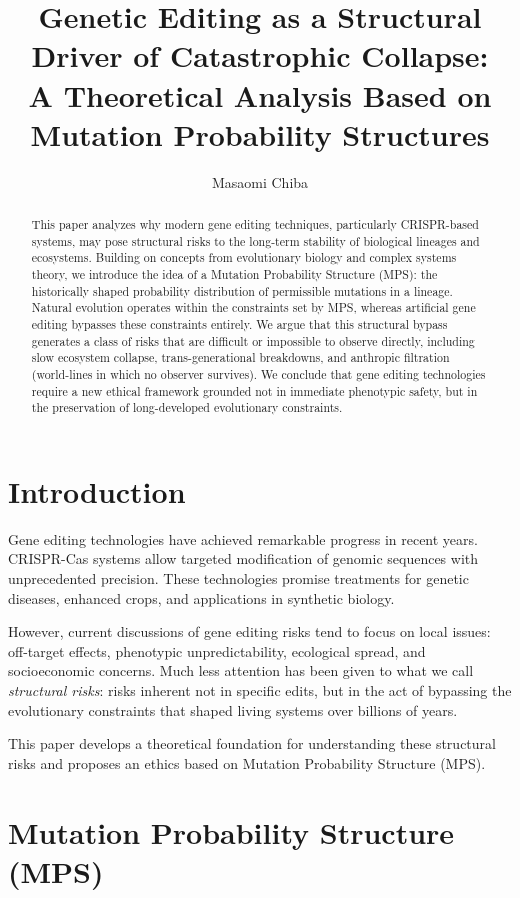 \documentclass[11pt]{article}
\title{Genetic Editing as a Structural Driver of Catastrophic Collapse:\\
A Theoretical Analysis Based on Mutation Probability Structures}
\author[1]{Masaomi Chiba}
\affil[1]{Independent Researcher}
\date{}
\begin{document}
\maketitle

\begin{abstract}
This paper analyzes why modern gene editing techniques, particularly CRISPR-based systems, may pose structural risks to the long-term stability of biological lineages and ecosystems. Building on concepts from evolutionary biology and complex systems theory, we introduce the idea of a Mutation Probability Structure (MPS): the historically shaped probability distribution of permissible mutations in a lineage. Natural evolution operates within the constraints set by MPS, whereas artificial gene editing bypasses these constraints entirely. We argue that this structural bypass generates a class of risks that are difficult or impossible to observe directly, including slow ecosystem collapse, trans-generational breakdowns, and anthropic filtration (world-lines in which no observer survives). We conclude that gene editing technologies require a new ethical framework grounded not in immediate phenotypic safety, but in the preservation of long-developed evolutionary constraints.
\end{abstract}

\section{Introduction}

Gene editing technologies have achieved remarkable progress in recent years. CRISPR-Cas systems allow targeted modification of genomic sequences with unprecedented precision. These technologies promise treatments for genetic diseases, enhanced crops, and applications in synthetic biology.

However, current discussions of gene editing risks tend to focus on local issues: off-target effects, phenotypic unpredictability, ecological spread, and socioeconomic concerns. Much less attention has been given to what we call \textit{structural risks}: risks inherent not in specific edits, but in the act of bypassing the evolutionary constraints that shaped living systems over billions of years.

This paper develops a theoretical foundation for understanding these structural risks and proposes an ethics based on Mutation Probability Structure (MPS).

\section{Mutation Probability Structure (MPS)}
\end{document}
